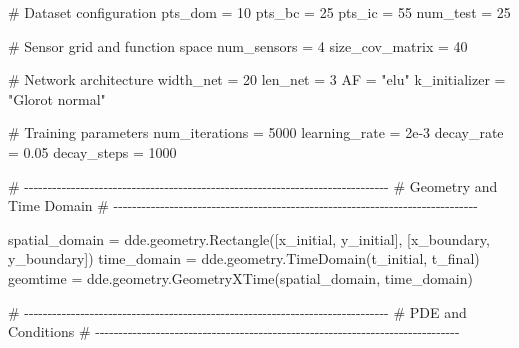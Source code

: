 \documentclass[
  spanish,
  us-letterpaper,
  DIV=11,
  numbers=noendperiod]{scrreprt}
\newenvironment{Shaded}{\begin{snugshade}}{\end{snugshade}}
\newcommand{\CommentTok}[1]{\textcolor[rgb]{0.37,0.37,0.37}{#1}}
\newcommand{\DecValTok}[1]{\textcolor[rgb]{0.68,0.00,0.00}{#1}}
\newcommand{\FloatTok}[1]{\textcolor[rgb]{0.68,0.00,0.00}{#1}}
\newcommand{\NormalTok}[1]{\textcolor[rgb]{0.00,0.23,0.31}{#1}}
\newcommand{\OperatorTok}[1]{\textcolor[rgb]{0.37,0.37,0.37}{#1}}
\newcommand{\StringTok}[1]{\textcolor[rgb]{0.13,0.47,0.30}{#1}}
\theoremstyle{definition}
\theoremstyle{plain}
\theoremstyle{remark}
\begin{document}
\begin{Shaded}
\begin{Highlighting}[]
\CommentTok{\# Dataset configuration}
\NormalTok{pts\_dom }\OperatorTok{=} \DecValTok{10}
\NormalTok{pts\_bc }\OperatorTok{=} \DecValTok{25}
\NormalTok{pts\_ic }\OperatorTok{=} \DecValTok{55}
\NormalTok{num\_test }\OperatorTok{=} \DecValTok{25}

\CommentTok{\# Sensor grid and function space}
\NormalTok{num\_sensors }\OperatorTok{=} \DecValTok{4}
\NormalTok{size\_cov\_matrix }\OperatorTok{=} \DecValTok{40}

\CommentTok{\# Network architecture}
\NormalTok{width\_net }\OperatorTok{=} \DecValTok{20}
\NormalTok{len\_net }\OperatorTok{=} \DecValTok{3}
\NormalTok{AF }\OperatorTok{=} \StringTok{"elu"}
\NormalTok{k\_initializer }\OperatorTok{=} \StringTok{"Glorot normal"}

\CommentTok{\# Training parameters}
\NormalTok{num\_iterations }\OperatorTok{=} \DecValTok{5000}
\NormalTok{learning\_rate }\OperatorTok{=} \FloatTok{2e{-}3}
\NormalTok{decay\_rate }\OperatorTok{=} \FloatTok{0.05}
\NormalTok{decay\_steps }\OperatorTok{=} \DecValTok{1000}

\CommentTok{\# {-}{-}{-}{-}{-}{-}{-}{-}{-}{-}{-}{-}{-}{-}{-}{-}{-}{-}{-}{-}{-}{-}{-}{-}{-}{-}{-}{-}{-}{-}{-}{-}{-}{-}{-}{-}{-}{-}{-}{-}{-}{-}{-}{-}{-}{-}{-}{-}{-}{-}{-}{-}{-}{-}{-}{-}{-}{-}{-}{-}{-}{-}{-}{-}{-}{-}{-}{-}{-}{-}{-}{-}{-}{-}{-}{-}{-}{-}}
\CommentTok{\# Geometry and Time Domain}
\CommentTok{\# {-}{-}{-}{-}{-}{-}{-}{-}{-}{-}{-}{-}{-}{-}{-}{-}{-}{-}{-}{-}{-}{-}{-}{-}{-}{-}{-}{-}{-}{-}{-}{-}{-}{-}{-}{-}{-}{-}{-}{-}{-}{-}{-}{-}{-}{-}{-}{-}{-}{-}{-}{-}{-}{-}{-}{-}{-}{-}{-}{-}{-}{-}{-}{-}{-}{-}{-}{-}{-}{-}{-}{-}{-}{-}{-}{-}{-}{-}}

\NormalTok{spatial\_domain }\OperatorTok{=}\NormalTok{ dde.geometry.Rectangle([x\_initial, y\_initial],}
\NormalTok{                                        [x\_boundary, y\_boundary])}
\NormalTok{time\_domain }\OperatorTok{=}\NormalTok{ dde.geometry.TimeDomain(t\_initial, t\_final)}
\NormalTok{geomtime }\OperatorTok{=}\NormalTok{ dde.geometry.GeometryXTime(spatial\_domain, time\_domain)}

\CommentTok{\# {-}{-}{-}{-}{-}{-}{-}{-}{-}{-}{-}{-}{-}{-}{-}{-}{-}{-}{-}{-}{-}{-}{-}{-}{-}{-}{-}{-}{-}{-}{-}{-}{-}{-}{-}{-}{-}{-}{-}{-}{-}{-}{-}{-}{-}{-}{-}{-}{-}{-}{-}{-}{-}{-}{-}{-}{-}{-}{-}{-}{-}{-}{-}{-}{-}{-}{-}{-}{-}{-}{-}{-}{-}{-}{-}{-}{-}{-}}
\CommentTok{\# PDE and Conditions}
\CommentTok{\# {-}{-}{-}{-}{-}{-}{-}{-}{-}{-}{-}{-}{-}{-}{-}{-}{-}{-}{-}{-}{-}{-}{-}{-}{-}{-}{-}{-}{-}{-}{-}{-}{-}{-}{-}{-}{-}{-}{-}{-}{-}{-}{-}{-}{-}{-}{-}{-}{-}{-}{-}{-}{-}{-}{-}{-}{-}{-}{-}{-}{-}{-}{-}{-}{-}{-}{-}{-}{-}{-}{-}{-}{-}{-}{-}{-}{-}{-}}


\end{Highlighting}
\end{Shaded}
\end{document}
